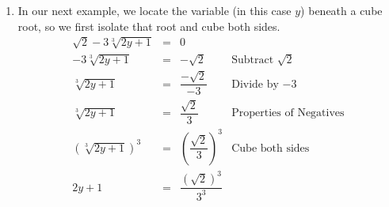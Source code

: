 \documentclass{ximera}
\begin{document}
{{{\begin{example}
\begin{enumerate}
\[\begin{array}{rclr}
t + \sqrt{2t+3}  & = & 6 & \\ [2pt]

\sqrt{2t+3} & = & 6 - t & \text{Subtract $t$} \\ [2pt]

(\sqrt{2t+3})^2 & = & (6-t)^2 & \text{Square both sides} \\ [2pt]

2t + 3 & = & 36-12t + t^2 & \text{F.O.I.L. / Perfect Square Trinomial} \\ [2pt]

0 & = & t^2 - 14t + 33 & \text{Subtract $2t$ and $3$} \\ [2pt]

0 & = & (t-3)(t-11) & \text{Factor} \\ \end{array} \] From the Zero Product Property, we know either $t - 3 = 0$ (which gives $t=3$) or $t-11 = 0$ (which gives $t=11$).  When checking our answers, we find $t = 3$ satisfies the original equation, but $t = 11$ does not.\footnote{It is worth noting that when $t=11$ is substituted into the original equation, we get $11 + \sqrt{25} = 6$.  If the $+\sqrt{25}$ were $-\sqrt{25}$, the solution would check. Once again, when squaring both sides of an equation, we lose track of $\pm$, which is what lets extraneous solutions in the door.}  So our final answer is $t = 3$ only.

\item  In our next example, we locate the variable (in this case $y$) beneath a cube root, so we first isolate that root and cube both sides. \[ \begin{array}{rclr}


\sqrt{2} - 3\sqrt[3]{2y+1} &  = &  0 & \\[2pt]

- 3\sqrt[3]{2y+1} &  = &  - \sqrt{2} & \text{Subtract $\sqrt{2}$} \\[2pt]

\sqrt[3]{2y+1} & = & \dfrac{-\sqrt{2}}{-3} & \text{Divide by $-3$} \\[8pt]

\sqrt[3]{2y+1} & = & \dfrac{\sqrt{2}}{3}  & \text{Properties of Negatives} \\[8pt]

(\sqrt[3]{2y+1})^3 & = & \left( \dfrac{\sqrt{2}}{3} \right)^{3} & \text{Cube both sides} \\[12pt]

2y + 1 & = & \dfrac{(\sqrt{2})^3}{3^3} & \\[8pt]


\end{array}\]
\end{enumerate}
\end{example}}}}
\end{document}
